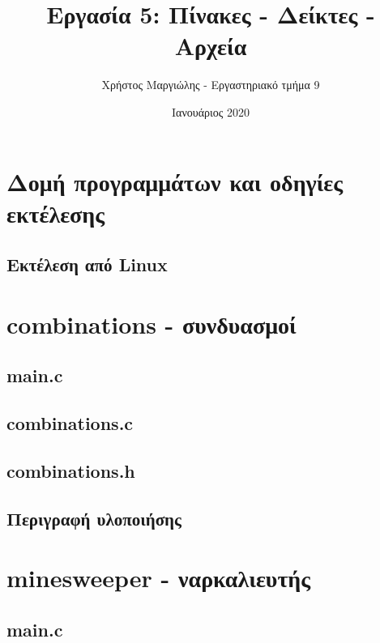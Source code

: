 \documentclass{article}
\title{Εργασία 5: Πίνακες - Δείκτες - Αρχεία}
\author{Χρήστος Μαργιώλης - Εργαστηριακό τμήμα 9}
\date{Ιανουάριος 2020}
\begin{document}
\begin{titlepage}
    \maketitle
\end{titlepage}

\renewcommand{\contentsname}{Περιεχόμενα}
\tableofcontents

\section{Δομή προγραμμάτων και οδηγίες εκτέλεσης}

    \subsection{Εκτέλεση από Linux}



\section{combinations - συνδυασμοί}

    \subsection{main.c}

    

    \subsection{combinations.c}



    \subsection{combinations.h}

    

    \subsection{Περιγραφή υλοποιήσης}

    

\section{minesweeper - ναρκαλιευτής}

    \subsection{main.c}
\end{document}
